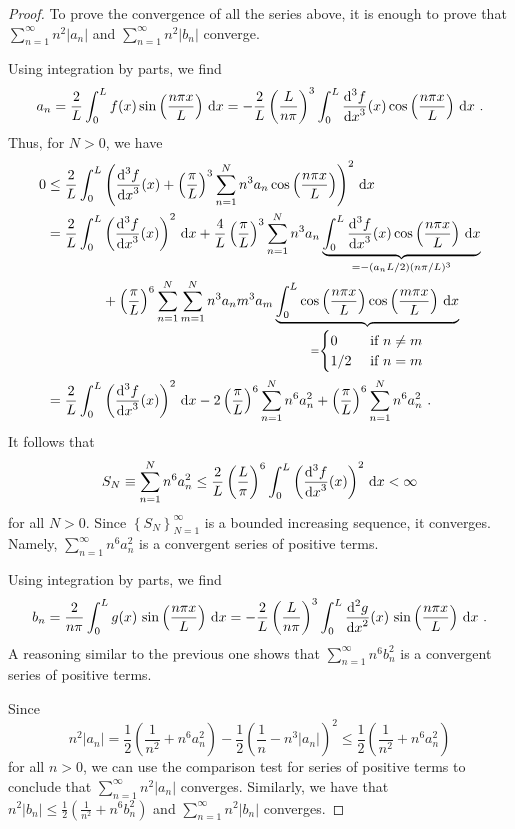 \begin{proof}
To prove the convergence of all the series above, it is enough to
prove that
$\displaystyle \sum_{n=1}^\infty n^2|a_n|$ and
$\displaystyle \sum_{n=1}^\infty n^2|b_n|$ converge.

Using integration by parts, we find
\[
a_n = \frac{2}{L} \int_0^L f(x) \sin\left(\frac{n\pi x}{L}\right) \,\mathrm{d}{x}
= -\frac{2}{L} \left( \frac{L}{n\pi}\right)^3 
\int_0^L \frac{\displaystyle \mathrm{d}^{3}{f}} {\displaystyle \mathrm{d}{x}^{3}}(x) \cos\left(\frac{n\pi x}{L}\right) \,\mathrm{d}{x} \  .
\]
Thus, for $N>0$, we have
\begin{align*}
0 &\leq \frac{2}{L} \int_0^L \left( \frac{\displaystyle \mathrm{d}^{3}{f}} {\displaystyle \mathrm{d}{x}^{3}}(x) +
\left(\frac{\pi}{L}\right)^3 \sum_{n=1}^N n^3 a_n
\cos\left(\frac{n\pi x}{L}\right) \right)^2 \,\mathrm{d}{x} \\
&= \frac{2}{L} \int_0^L \left( \frac{\displaystyle \mathrm{d}^{3}{f}} {\displaystyle \mathrm{d}{x}^{3}}(x) \right)^2 \,\mathrm{d}{x}
+ \frac{4}{L} \left(\frac{\pi}{L}\right)^3
\sum_{n=1}^N n^3 a_n \underbrace{\int_0^L \frac{\displaystyle \mathrm{d}^{3}{f}} {\displaystyle \mathrm{d}{x}^{3}}(x)
\cos\left(\frac{n\pi x}{L}\right)
\,\mathrm{d}{x}}_{=-(a_n L/2)(n \pi/L)^3} \\
&\qquad \qquad + \left(\frac{\pi}{L}\right)^6 \sum_{n=1}^N \sum_{m=1}^N
n^3 a_n m^3 a_m \underbrace{\int_0^L \cos\left(\frac{n\pi x}{L}\right)
\cos\left(\frac{m\pi x}{L}\right) \,\mathrm{d}{x}}_{=
\begin{cases} 0 &\text{ if } n\neq m\\ 1/2 & \text{ if } n = m
\end{cases}} \\
&= \frac{2}{L} \int_0^L \left( \frac{\displaystyle \mathrm{d}^{3}{f}} {\displaystyle \mathrm{d}{x}^{3}}(x) \right)^2 \,\mathrm{d}{x}
- 2 \left(\frac{\pi}{L}\right)^6 \sum_{n=1}^N n^6 a_n^2
+ \left(\frac{\pi}{L}\right)^6 \sum_{n=1}^N n^6 a_n^2 \ .
\end{align*}
It follows that
\[
S_N \equiv \sum_{n=1}^N n^6 a_n^2 \leq
\frac{2}{L} \left(\frac{L}{\pi}\right)^6
\int_0^L \left( \frac{\displaystyle \mathrm{d}^{3}{f}} {\displaystyle \mathrm{d}{x}^{3}}(x) \right)^2 \,\mathrm{d}{x} <
\infty
\]
for all $N>0$.  Since
$\displaystyle \left\{ S_N \right\}_{N=1}^\infty$ is a bounded increasing 
sequence, it converges.  Namely, $\displaystyle \sum_{n=1}^\infty n^6 a_n^2$
is a convergent series of positive terms.

Using integration by parts, we find
\[
b_n = \frac{2}{n\pi} \int_0^L g(x) \, \sin\left(\frac{n\pi x}{L}\right) \,\mathrm{d}{x}
= -\frac{2}{L} \left( \frac{L}{n\pi}\right)^3 \int_0^L
\frac{\displaystyle \mathrm{d}^{2}{g}} {\displaystyle \mathrm{d}{x}^{2}}(x) \, \sin\left( \frac{n\pi x}{L}\right) \,\mathrm{d}{x} \  .
\]
A reasoning similar to the previous one shows that
$\displaystyle \sum_{n=1}^\infty n^6 b_n^2$
is a convergent series of positive terms.

Since
\[
n^2 |a_n| = \frac{1}{2} \left( \frac{1}{n^2} + n^6 a_n^2\right) -
\frac{1}{2} \left( \frac{1}{n} - n^3 |a_n| \right)^2 \leq \frac{1}{2}
\left( \frac{1}{n^2} + n^6 a_n^2\right)
\]
for all $n>0$, we can use the comparison test for series of positive
terms to conclude that $\displaystyle \sum_{n=1}^\infty n^2 |a_n|$
converges.  Similarly, we have that
$\displaystyle n^2 |b_n| \leq \frac{1}{2} \left( \frac{1}{n^2} + n^6
  b_n^2\right)$ and $\displaystyle \sum_{n=1}^\infty n^2 |b_n|$ converges.
\end{proof}


